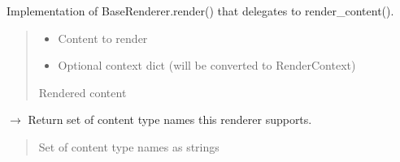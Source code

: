 \documentclass[letterpaper,10pt,english]{sphinxmanual}
\begin{document}
\begin{fulllineitems}
\begin{fulllineitems}
\sphinxAtStartPar
Implementation of BaseRenderer.render() that delegates to render\_content().
\begin{quote}\begin{description}
\begin{itemize}
\item {} 
\sphinxAtStartPar
{} \textendash{} Content to render

\item {} 
\sphinxAtStartPar
{} \textendash{} Optional context dict (will be converted to RenderContext)

\end{itemize}

\sphinxAtStartPar
Rendered content

\end{description}\end{quote}

\end{fulllineitems}


\begin{fulllineitems}
\label{\detokenize{api/renderers:src.renderers.base.content.ContentRenderer.get_supported_content_types}}
\pysigstartsignatures
\pysiglinewithargsret
{}
{}
{{ $\rightarrow$ \DUrole{p}{{[}}\DUrole{p}{{]}}}}
\pysigstopsignatures
\sphinxAtStartPar
Return set of content type names this renderer supports.
\begin{quote}\begin{description}
\sphinxAtStartPar
Set of content type names as strings

\end{description}\end{quote}

\end{fulllineitems}


\end{fulllineitems}
\end{document}
